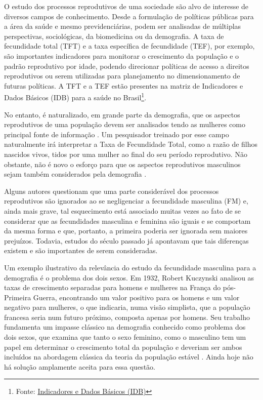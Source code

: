 
O estudo dos processos reprodutivos de uma sociedade são alvo de interesse de  diversos campos de conhecimento. Desde a formulação de políticas públicas para a área da saúde e mesmo previdenciárias, podem ser analisadas de múltiplas perspectivas, sociológicas, da biomedicina ou da demografia. A taxa de fecundidade total (TFT) e a taxa específica de fecundidade (TEF), por exemplo, são importantes indicadores para monitorar o crescimento da população e o padrão reprodutivo por idade, podendo direcionar políticas de acesso a direitos reprodutivos ou serem utilizadas para planejamento no dimensionamento de futuras políticas. A TFT e a TEF estão presentes na matriz de Indicadores e Dados Básicos (IDB) para a saúde no Brasil\footnote{Fonte: \href{http://tabnet.datasus.gov.br/tabdata/livroidb/2ed/indicadores.pdf}{Indicadores e Dados Básicos (IDB)}}.

No entanto, é naturalizado, em grande parte da demografia, que os aspectos reprodutivos de uma população devem ser analisados tendo as mulheres como principal fonte de informação \cite{watkins1993if}. Um pesquisador treinado por esse campo naturalmente irá interpretar a Taxa de Fecundidade Total, como a razão de filhos nascidos vivos, tidos por uma mulher ao final do seu período reprodutivo. 
Não obstante, não é novo o esforço para que os aspectos reprodutivos masculinos sejam também considerados pela demografia \cite{greene2000absent, goldscheider1996fertility}.

Alguns autores questionam que uma parte considerável dos processos reprodutivos são ignorados ao se negligenciar a fecundidade masculina (FM) e, ainda mais grave, tal esquecimento está associado muitas vezes ao fato de se considerar que as fecundidades masculina e feminina são iguais e se comportam da mesma forma e que, portanto, a primeira poderia ser ignorada sem maiores prejuízos. Todavia, estudos do século passado \cite{karmel1947relations, schoen1985population} já apontavam que tais diferenças existem e são importantes de serem consideradas. 	

Um exemplo ilustrativo da relevância do estudo da fecundidade masculina para a demografia é o problema dos dois sexos. Em 1932, Robert Kuczynski analisou as taxas de crescimento separadas para homens e mulheres na França do pós-Primeira Guerra, encontrando um valor positivo para os homens e um valor negativo para mulheres, o que indicaria, numa visão simplista, que a população francesa seria num futuro próximo, composta apenas por homens. Seu trabalho fundamenta um impasse clássico na demografia conhecido como problema dos dois sexos, que examina que tanto o sexo feminino, como o masculino tem um papel em determinar o crescimento total da população e deveriam ser ambos incluídos na abordagem clássica da teoria da população estável \cite{chung1994cycles}. Ainda hoje não há solução amplamente aceita para essa questão. 

